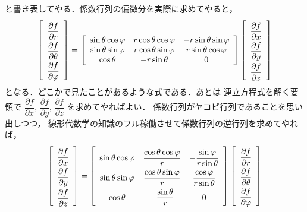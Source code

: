 と書き表してやる．係数行列の偏微分を実際に求めてやると，
\begin{align*}
\left[ 
\renewcommand{\arraystretch}{2}
\begin{array}{c}
\dfrac{ \partial f} {\partial r} \\
\dfrac{ \partial f} {\partial \theta} \\
\dfrac{ \partial f} {\partial \varphi}
\end{array}
\right] = \left[
\renewcommand{\arraystretch}{1}
\begin{array}{ccc}
\sin \theta \cos \varphi & r \cos \theta \cos \varphi & - r \sin \theta \sin \varphi \\
\sin \theta \sin \varphi & r \cos \theta \sin \varphi & r \sin \theta \cos \varphi \\
\cos \theta & -r \sin \theta & 0
\end{array}
\right]
\left[
\renewcommand{\arraystretch}{2}
\begin{array}{c}
\dfrac{ \partial f} {\partial x} \\
\dfrac{ \partial f} {\partial y} \\
\dfrac{ \partial f} {\partial z}
\end{array}
\right]
\renewcommand{\arraystretch}{1}
\end{align*}
となる．どこかで見たことがあるような式である．あとは
連立方程式を解く要領で
$\dfrac{ \partial f} {\partial x} , \, \dfrac{ \partial f} {\partial y} , \, \dfrac{ \partial f} {\partial z}$
を求めてやればよい．
係数行列がヤコビ行列であることを思い出しつつ，
線形代数学の知識のフル稼働させて係数行列の逆行列を求めてやれば，
\begin{align*}
\left[
\renewcommand{\arraystretch}{2}
\begin{array}{c}
\dfrac{ \partial f} {\partial x} \\
\dfrac{ \partial f} {\partial y} \\
\dfrac{ \partial f} {\partial z}
\end{array}
\right] = \left[
\begin{array}{ccc}
\sin \theta \cos \varphi & \dfrac{ \cos \theta \cos \varphi}{r}
& - \dfrac{ \sin \varphi }{r \sin \theta } \\
\sin \theta \sin \varphi & \dfrac{ \cos \theta \sin \varphi}{r}
& \dfrac{ \cos \varphi }{r \sin \theta } \\
\cos \theta & - \dfrac{ \sin \theta }{r} & 0 
\end{array}
\right] \left[
\begin{array}{c}
\dfrac{ \partial f} {\partial r} \\
\dfrac{ \partial f} {\partial \theta} \\
\dfrac{ \partial f} {\partial \varphi}
\end{array}
\right] 
\end{align*}
